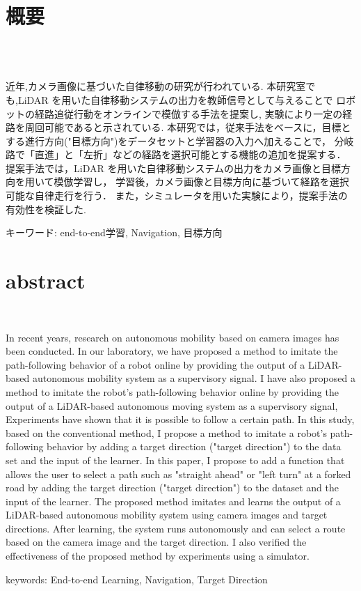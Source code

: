 \chapter*{概要}
\thispagestyle{empty}
%
\begin{center}
  \scalebox{1.5}{カメラ画像と目標方向を用いたend-end学習による}\\
  \scalebox{1.5}{分岐路でのルート選択可能なのnavigation手法の提案}\\
\end{center}
\vspace{1.0zh}
%

近年,カメラ画像に基づいた自律移動の研究が行われている.
本研究室でも,LiDAR を用いた自律移動システムの出力を教師信号として与えることで
ロボットの経路追従行動をオンラインで模倣する手法を提案し,
実験により一定の経路を周回可能であると示されている.
本研究では，従来手法をベースに，目標とする進行方向("目標方向")をデータセットと学習器の入力へ加えることで，
分岐路で「直進」と「左折」などの経路を選択可能とする機能の追加を提案する．
提案手法では，LiDAR を用いた自律移動システムの出力をカメラ画像と目標方向を用いて模倣学習し，
学習後，カメラ画像と目標方向に基づいて経路を選択可能な自律走行を行う．
また，シミュレータを用いた実験により，提案手法の有効性を検証した. 

キーワード: end-to-end学習, Navigation, 目標方向
%
\newpage
\chapter*{abstract}
\thispagestyle{empty}
%
\begin{center}
  \scalebox{1.3}{An End-to-End Navigation Method for Route Selection on Branch Roads}
  \scalebox{1.3}{Using Camera Images and Target Directions}\\
\end{center}
\vspace{1.0zh}
%

In recent years, research on autonomous mobility based on camera images has been conducted.
In our laboratory, we have proposed a method to imitate the path-following behavior of a robot online by providing the output of a LiDAR-based autonomous mobility system as a supervisory signal. I have also proposed a method to imitate the robot's path-following behavior online by providing the output of a LiDAR-based autonomous moving system as a supervisory signal, Experiments have shown that it is possible to follow a certain path.
In this study, based on the conventional method, I propose a method to imitate a robot's path-following behavior by adding a target direction ("target direction") to the data set and the input of the learner. 
In this paper, I propose to add a function that allows the user to select a path such as "straight ahead" or "left turn" at a forked road by adding the target direction ("target direction") to the dataset and the input of the learner.
The proposed method imitates and learns the output of a LiDAR-based autonomous mobility system using camera images and target directions.
After learning, the system runs autonomously and can select a route based on the camera image and the target direction.
I also verified the effectiveness of the proposed method by experiments using a simulator. 


keywords: End-to-end Learning, Navigation, Target Direction
